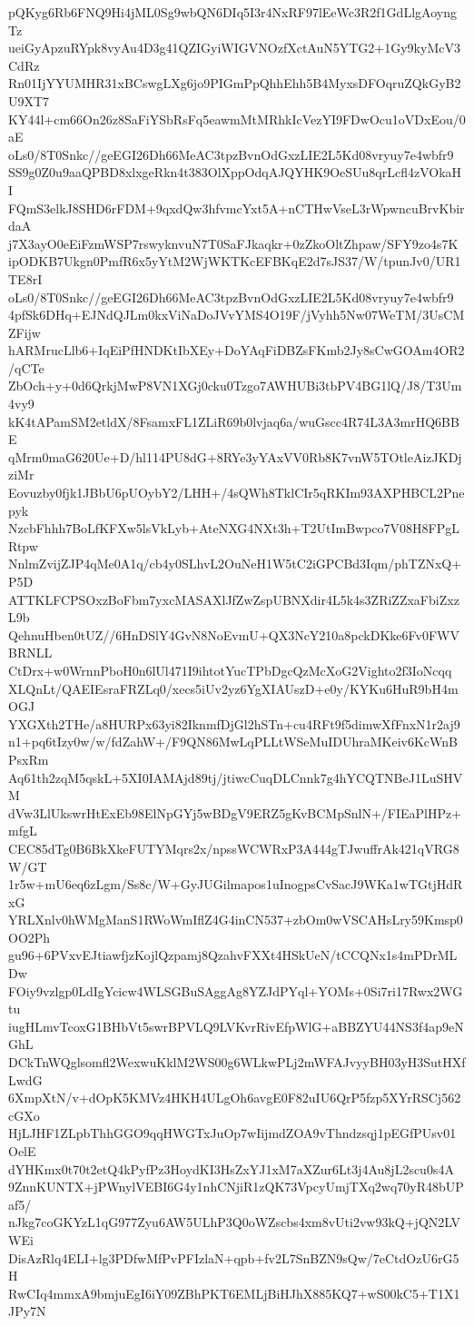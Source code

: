 pQKyg6Rb6FNQ9Hi4jML0Sg9wbQN6DIq5I3r4NxRF97lEeWc3R2f1GdLlgAoyngTz
ueiGyApzuRYpk8vyAu4D3g41QZIGyiWIGVNOzfXctAuN5YTG2+1Gy9kyMcV3CdRz
Rn01IjYYUMHR31xBCswgLXg6jo9PIGmPpQhhEhh5B4MyxsDFOqruZQkGyB2U9XT7
KY44l+cm66On26z8SaFiYSbRsFq5eawmMtMRhkIcVezYI9FDwOcu1oVDxEou/0aE
oLs0/8T0Snkc//geEGI26Dh66MeAC3tpzBvnOdGxzLIE2L5Kd08vryuy7e4wbfr9
SS9g0Z0u9aaQPBD8xlxgeRkn4t383OlXppOdqAJQYHK9OeSUu8qrLcfl4zVOkaHI
FQmS3elkJ8SHD6rFDM+9qxdQw3hfvmcYxt5A+nCTHwVseL3rWpwncuBrvKbirdaA
j7X3ayO0eEiFzmWSP7rswyknvuN7T0SaFJkaqkr+0zZkoOltZhpaw/SFY9zo4s7K
ipODKB7Ukgn0PmfR6x5yYtM2WjWKTKcEFBKqE2d7sJS37/W/tpunJv0/UR1TE8rI
oLs0/8T0Snkc//geEGI26Dh66MeAC3tpzBvnOdGxzLIE2L5Kd08vryuy7e4wbfr9
4pfSk6DHq+EJNdQJLm0kxViNaDoJVvYMS4O19F/jVyhh5Nw07WeTM/3UsCMZFijw
hARMrucLlb6+IqEiPfHNDKtIbXEy+DoYAqFiDBZsFKmb2Jy8sCwGOAm4OR2/qCTe
ZbOch+y+0d6QrkjMwP8VN1XGj0cku0Tzgo7AWHUBi3tbPV4BG1lQ/J8/T3Um4vy9
kK4tAPamSM2etldX/8FsamxFL1ZLiR69b0lvjaq6a/wuGscc4R74L3A3mrHQ6BBE
qMrm0maG620Ue+D/hl114PU8dG+8RYe3yYAxVV0Rb8K7vnW5TOtleAizJKDjziMr
Eovuzby0fjk1JBbU6pUOybY2/LHH+/4sQWh8TklCIr5qRKIm93AXPHBCL2Pnepyk
NzcbFhhh7BoLfKFXw5lsVkLyb+AteNXG4NXt3h+T2UtImBwpco7V08H8FPgLRtpw
NnlmZvijZJP4qMe0A1q/cb4y0SLhvL2OuNeH1W5tC2iGPCBd3Iqm/phTZNxQ+P5D
ATTKLFCPSOxzBoFbm7yxcMASAXlJfZwZspUBNXdir4L5k4s3ZRiZZxaFbiZxzL9b
QehnuHben0tUZ//6HnDSlY4GvN8NoEvmU+QX3NcY210a8pckDKke6Fv0FWVBRNLL
CtDrx+w0WrnnPboH0n6lUl471I9ihtotYucTPbDgcQzMcXoG2Vighto2f3IoNcqq
XLQnLt/QAEIEsraFRZLq0/xecs5iUv2yz6YgXIAUszD+e0y/KYKu6HuR9bH4mOGJ
YXGXth2THe/a8HURPx63yi82IknmfDjGl2hSTn+cu4RFt9f5dimwXfFnxN1r2aj9
n1+pq6tIzy0w/w/fdZahW+/F9QN86MwLqPLLtWSeMuIDUhraMKeiv6KcWnBPsxRm
Aq61th2zqM5qskL+5XI0IAMAjd89tj/jtiwcCuqDLCnnk7g4hYCQTNBeJ1LuSHVM
dVw3LlUkswrHtExEb98ElNpGYj5wBDgV9ERZ5gKvBCMpSnlN+/FIEaPlHPz+mfgL
CEC85dTg0B6BkXkeFUTYMqrs2x/npssWCWRxP3A444gTJwuffrAk421qVRG8W/GT
1r5w+mU6eq6zLgm/Ss8c/W+GyJUGilmapos1uInogpsCvSacJ9WKa1wTGtjHdRxG
YRLXnlv0hWMgManS1RWoWmIflZ4G4inCN537+zbOm0wVSCAHsLry59Kmsp0OO2Ph
gu96+6PVxvEJtiawfjzKojlQzpamj8QzahvFXXt4HSkUeN/tCCQNx1s4mPDrMLDw
FOiy9vzlgp0LdIgYcicw4WLSGBuSAggAg8YZJdPYql+YOMs+0Si7ri17Rwx2WGtu
iugHLmvTcoxG1BHbVt5swrBPVLQ9LVKvrRivEfpWlG+aBBZYU44NS3f4ap9eNGhL
DCkTnWQglsomfl2WexwuKklM2WS00g6WLkwPLj2mWFAJvyyBH03yH3SutHXfLwdG
6XmpXtN/v+dOpK5KMVz4HKH4ULgOh6avgE0F82uIU6QrP5fzp5XYrRSCj562cGXo
HjLJHF1ZLpbThhGGO9qqHWGTxJuOp7wIijmdZOA9vThndzsqj1pEGfPUsv01OelE
dYHKmx0t70t2etQ4kPyfPz3HoydKI3HsZxYJ1xM7aXZur6Lt3j4Au8jL2scu0s4A
9ZnnKUNTX+jPWnylVEBI6G4y1nhCNjiR1zQK73VpcyUmjTXq2wq70yR48bUPaf5/
nJkg7coGKYzL1qG977Zyu6AW5ULhP3Q0oWZscbs4xm8vUti2vw93kQ+jQN2LVWEi
DisAzRlq4ELI+lg3PDfwMfPvPFIzlaN+qpb+fv2L7SnBZN9sQw/7eCtdOzU6rG5H
RwCIq4mmxA9bmjuEgI6iY09ZBhPKT6EMLjBiHJhX885KQ7+wS00kC5+T1X1JPy7N
